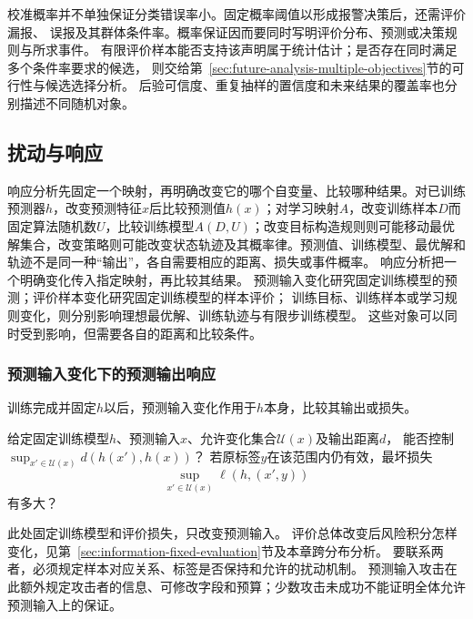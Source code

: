 校准概率并不单独保证分类错误率小。固定概率阈值以形成报警决策后，还需评价漏报、
误报及其群体条件率。概率保证因而要同时写明评价分布、预测或决策规则与所求事件。
有限评价样本能否支持该声明属于统计估计；是否存在同时满足多个条件率要求的候选，
则交给第~\ref{sec:future-analysis-multiple-objectives}节的可行性与候选选择分析。
后验可信度、重复抽样的置信度和未来结果的覆盖率也分别描述不同随机对象。

\subsection{扰动与响应}
\label{sec:future-robustness-security-map}
\label{sec:future-privacy-unlearning-map}

响应分析先固定一个映射，再明确改变它的哪个自变量、比较哪种结果。对已训练预测器\(h\)，改变预测特征\(x\)后比较预测值\(h(x)\)；对学习映射\(A\)，改变训练样本\(D\)而固定算法随机数\(U\)，比较训练模型\(A(D,U)\)；改变目标构造规则则可能移动最优解集合，改变策略则可能改变状态轨迹及其概率律。预测值、训练模型、最优解和轨迹不是同一种“输出”，各自需要相应的距离、损失或事件概率。
响应分析把一个明确变化传入指定映射，再比较其结果。
预测输入变化研究固定训练模型的预测；评价样本变化研究固定训练模型的样本评价；
训练目标、训练样本或学习规则变化，则分别影响理想最优解、训练轨迹与有限步训练模型。
这些对象可以同时受到影响，但需要各自的距离和比较条件。

\subsubsection{预测输入变化下的预测输出响应}
\label{sec:future-analysis-robustness}

训练完成并固定$h$以后，预测输入变化作用于$h$本身，比较其输出或损失。

\begin{mathproblem}[预测输入扰动的输出与损失响应]
  \label{question:future-robustness}
  给定固定训练模型$h$、预测输入$x$、允许变化集合$\mathcal U(x)$及输出距离$d$，
  能否控制$\sup_{x'\in\mathcal U(x)}d(h(x'),h(x))$？
  若原标签$y$在该范围内仍有效，最坏损失
  \[
    \sup_{x'\in\mathcal U(x)}\ell(h,(x',y))
  \]
  有多大？
\end{mathproblem}

此处固定训练模型和评价损失，只改变预测输入。
评价总体改变后风险积分怎样变化，见第~\ref{sec:information-fixed-evaluation}节及本章跨分布分析。
要联系两者，必须规定样本对应关系、标签是否保持和允许的扰动机制。
预测输入攻击在此额外规定攻击者的信息、可修改字段和预算；少数攻击未成功不能证明全体允许预测输入上的保证。

